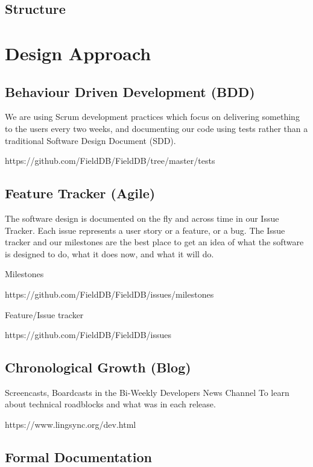\documentclass[12pt]{article}
\begin{document}
\subsection{Structure}


\section{Design Approach}

\subsection{Behaviour Driven Development (BDD)}

We are using Scrum development practices which focus on delivering something to the users every two weeks, and documenting our code using tests rather than a traditional Software Design Document (SDD).

https://github.com/FieldDB/FieldDB/tree/master/tests

\subsection{Feature Tracker (Agile)}

The software design is documented on the fly and across time in our Issue Tracker. Each issue represents a user story or a feature, or a bug. The Issue tracker and our milestones are the best place to get an idea of what the software is designed to do, what it does now, and what it will do.

Milestones

https://github.com/FieldDB/FieldDB/issues/milestones

Feature/Issue tracker

https://github.com/FieldDB/FieldDB/issues

\subsection{Chronological Growth (Blog)}

Screencasts, Boardcasts in the Bi-Weekly Developers News Channel To learn about technical roadblocks and what was in each release.

https://www.lingsync.org/dev.html


\subsection{Formal Documentation}
\end{document}
